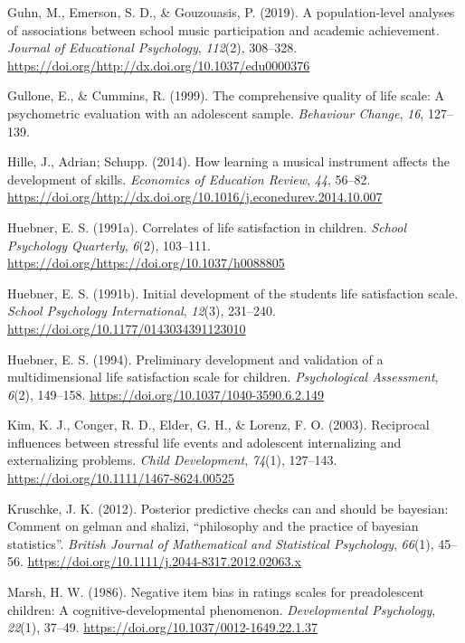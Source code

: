 \documentclass[a4, 12pt]{article}
\begin{document}
\leavevmode\hypertarget{ref-Guhn2019}{}%
Guhn, M., Emerson, S. D., \& Gouzouasis, P. (2019). A population-level analyses of associations between school music participation and academic achievement. \emph{Journal of Educational Psychology}, \emph{112}(2), 308--328. \url{https://doi.org/http://dx.doi.org/10.1037/edu0000376}

\leavevmode\hypertarget{ref-Gullone1999}{}%
Gullone, E., \& Cummins, R. (1999). The comprehensive quality of life scale: A psychometric evaluation with an adolescent sample. \emph{Behaviour Change}, \emph{16}, 127--139.

\leavevmode\hypertarget{ref-Hille2014}{}%
Hille, J., Adrian; Schupp. (2014). How learning a musical instrument affects the development of skills. \emph{Economics of Education Review}, \emph{44}, 56--82. \url{https://doi.org/http://dx.doi.org/10.1016/j.econedurev.2014.10.007}

\leavevmode\hypertarget{ref-Huebner1991}{}%
Huebner, E. S. (1991a). Correlates of life satisfaction in children. \emph{School Psychology Quarterly}, \emph{6}(2), 103--111. \url{https://doi.org/https://doi.org/10.1037/h0088805}

\leavevmode\hypertarget{ref-Huebner1991a}{}%
Huebner, E. S. (1991b). Initial development of the students life satisfaction scale. \emph{School Psychology International}, \emph{12}(3), 231--240. \url{https://doi.org/10.1177/0143034391123010}

\leavevmode\hypertarget{ref-Huebner1994}{}%
Huebner, E. S. (1994). Preliminary development and validation of a multidimensional life satisfaction scale for children. \emph{Psychological Assessment}, \emph{6}(2), 149--158. \url{https://doi.org/10.1037/1040-3590.6.2.149}

\leavevmode\hypertarget{ref-Kim2003}{}%
Kim, K. J., Conger, R. D., Elder, G. H., \& Lorenz, F. O. (2003). Reciprocal influences between stressful life events and adolescent internalizing and externalizing problems. \emph{Child Development}, \emph{74}(1), 127--143. \url{https://doi.org/10.1111/1467-8624.00525}

\leavevmode\hypertarget{ref-Kruschke2012}{}%
Kruschke, J. K. (2012). Posterior predictive checks can and should be bayesian: Comment on gelman and shalizi, ``philosophy and the practice of bayesian statistics''. \emph{British Journal of Mathematical and Statistical Psychology}, \emph{66}(1), 45--56. \url{https://doi.org/10.1111/j.2044-8317.2012.02063.x}

\leavevmode\hypertarget{ref-Marsh1986}{}%
Marsh, H. W. (1986). Negative item bias in ratings scales for preadolescent children: A cognitive-developmental phenomenon. \emph{Developmental Psychology}, \emph{22}(1), 37--49. \url{https://doi.org/10.1037/0012-1649.22.1.37}
\end{document}
